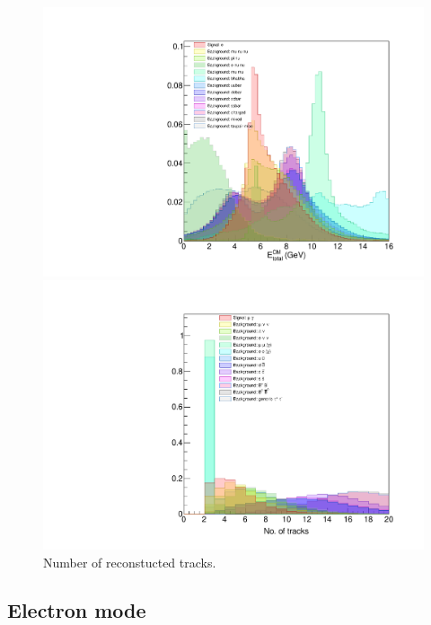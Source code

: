 \documentclass[12pt]{thesis}  %
\begin{document}
\begin{figure}
\begin{minipage}{.475\textwidth}
  \includegraphics[width=\linewidth]{images/tauMG-totalCM_E.pdf}
  \caption[]%
  {{\small Total center-of-mass energy of the system.}}    
  \label{fig:tauMG EtotalCM}
\end{minipage}%
        \hfill
\begin{minipage}{.475\textwidth}
  \centering
  \includegraphics[width=\linewidth]{images/tauMG-tracks.pdf}
  \caption[]%
  {{\small Number of reconstucted tracks.}}  
  \label{fig:tauMG tracks}
\end{minipage}
\end{figure}

\subsection{Electron mode}
\end{document}
